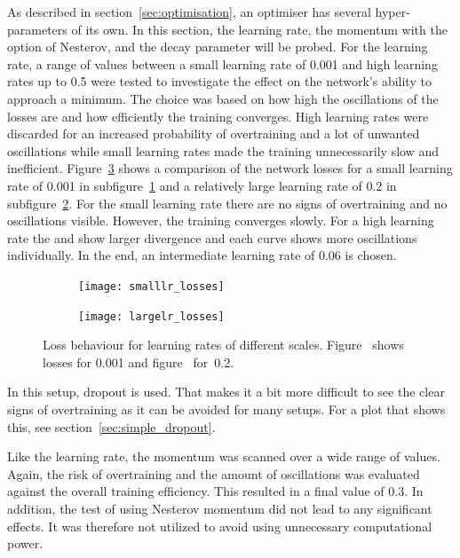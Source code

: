 As described in section~\ref{sec:optimisation}, an optimiser has several hyper-parameters of its own. In this section, the learning rate, the momentum with the option of Nesterov, and the decay parameter will be probed.
For the learning rate, a range of values between a small learning rate of \num{0.001} and high learning rates up to \num{0.5} were tested to investigate the effect on the network's ability to approach a minimum. The choice was based on how high the oscillations of the losses are and how efficiently the training converges. High learning rates were discarded for an increased probability of overtraining and a lot of unwanted oscillations while small learning rates made the training unnecessarily slow and inefficient. Figure~\ref{fig:lr} shows a comparison of the network losses for a small learning rate of \num{0.001} in subfigure~\ref{fig:lr:small} and a relatively large learning rate of \num{0.2} in subfigure~\ref{fig:lr:large}. For the small learning rate there are no signs of overtraining and no oscillations visible. However, the training converges slowly. For a high learning rate the \losstrain and \losstest show larger divergence and each curve shows more oscillations individually. In the end, an intermediate learning rate of \num{0.06} is chosen.
%
\begin{figure}[htbp]
    \centering
    \begin{subfigure}[b]{0.48\textwidth}
        \texttt{[image: smalllr\_losses]}
        \caption{}
        \label{fig:lr:small}
    \end{subfigure}
\quad
    \begin{subfigure}[b]{0.48\textwidth}
        \texttt{[image: largelr\_losses]}
        \caption{}
        \label{fig:lr:large}
    \end{subfigure}
    \caption[Classifier loss for different learning rates]{Loss behaviour for learning rates of different scales. Figure~ shows losses for \num{0.001} and figure~ for~\num{0.2}.}
	\label{fig:lr}
\end{figure}
%
In this setup, dropout is used. That makes it a bit more difficult to see the clear signs of overtraining as it can be avoided for many setups. For a plot that shows this, see section~\ref{sec:simple_dropout}.

Like the learning rate, the momentum was scanned over a wide range of values. Again, the risk of overtraining and the amount of oscillations was evaluated against the overall training efficiency. This resulted in a final value of \num{0.3}. In addition, the test of using Nesterov momentum did not lead to any significant effects. It was therefore not utilized to avoid using unnecessary computational power.

